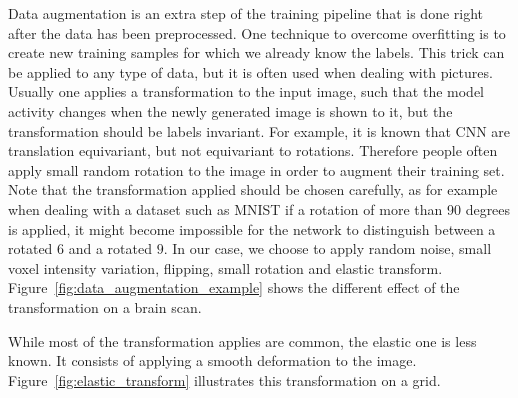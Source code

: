 Data augmentation is an extra step of the training pipeline that is done right after the data has been preprocessed. One technique to overcome overfitting is to create new training samples for which we already know the labels. This trick can be applied to any type of data, but it is often used when dealing with pictures. Usually one applies a transformation to the input image, such that the model activity changes when the newly generated image is shown to it, but the transformation should be labels invariant. 
For example, it is known that CNN are translation equivariant, but not equivariant to rotations. Therefore people often apply small random rotation to the image in order to augment their training set. Note that the transformation applied should be chosen carefully, as for example when dealing with a dataset such as MNIST if a rotation of more than 90 degrees is applied, it might become impossible for the network to distinguish between a rotated $6$ and a rotated $9$. 
In our case, we choose to apply random noise, small voxel intensity variation, flipping, small rotation and elastic transform. Figure~\ref{fig:data_augmentation_example} shows the different effect of the transformation on a brain scan.

While most of the transformation applies are common, the elastic one is less known. It consists of applying a smooth deformation to the image. Figure~\ref{fig:elastic_transform} illustrates this transformation on a grid.


